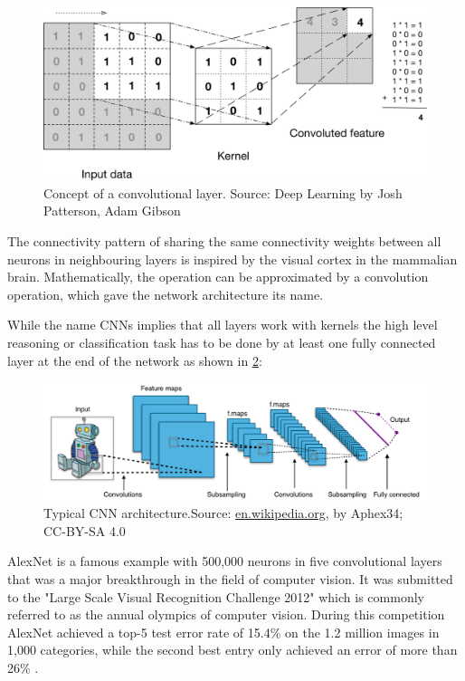 \begin{figure}[h]
    \centering
	\includegraphics[width=.8\textwidth]{./images/illustrations/cnn}
    \caption{Concept of a convolutional layer. Source: Deep Learning by Josh Patterson, Adam Gibson}
    \label{fig:cnn}
\end{figure}


The connectivity pattern of sharing the same connectivity weights between all neurons in neighbouring layers is inspired by the visual cortex in the mammalian brain.
Mathematically, the operation can be approximated by a convolution operation, which gave the network architecture its name. 

While the name CNNs implies that all layers work with kernels the high level reasoning or classification task has to be done by at least one fully connected layer at the end of the network as shown in \ref{fig:typical-cnn}:


\begin{figure}[h]
    \centering
	\includegraphics[width=.95\textwidth]{./images/illustrations/typical-cnn}
    \caption{Typical CNN architecture.\newline Source: \url{en.wikipedia.org}, by Aphex34; CC-BY-SA 4.0}
    \label{fig:typical-cnn}
\end{figure}


AlexNet is a famous example with 500,000 neurons in five convolutional layers \cite{AlexNet} that was a major breakthrough in the field of computer vision. It was submitted to the "Large Scale Visual Recognition Challenge 2012" which is commonly referred to as the annual olympics of computer vision.
During this competition AlexNet achieved a top-5 test error rate of 15.4\% on the 1.2 million images in 1,000 categories, while the second best entry only achieved an error of more than 26\% \cite{ILSVRC15}. 


